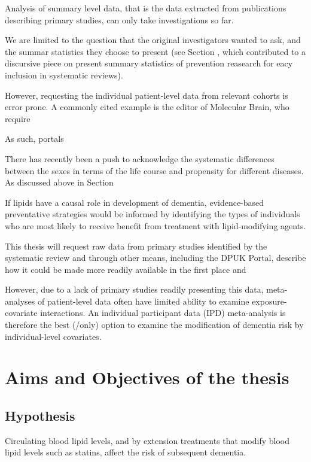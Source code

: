 \documentclass[a4paper,nobind]{templates/ociamthesis}
\begin{document}
Analysis of summary level data, that is the data extracted from publications describing primary studies, can only take investigations so far.

We are limited to the question that the original investigators wanted to ask, and the summar statistics they choose to present (see Section , which contributed to a discursive piece on present summary statistics of prevention reasearch for eacy inclusion in systematic reviews).

However, requesting the individual patient-level data from relevant cohorts is error prone. A commonly cited example is the editor of Molecular Brain, who require

As such, portals

There has recently been a push to acknowledge the systematic differences between the sexes in terms of the life course and propensity for different diseases. As discussed above in Section

If lipids have a causal role in development of dementia, evidence-based preventative strategies would be informed by identifying the types of individuals who are most likely to receive benefit from treatment with lipid-modifying agents.

This thesis will request raw data from primary studies identified by the systematic review and through other means, including the DPUK Portal, describe how it could be made more readily available in the first place and

However, due to a lack of primary studies readily presenting this data, meta-analyses of patient-level data often have limited ability to examine exposure-covariate interactions. An individual participant data (IPD) meta-analysis is therefore the best (/only) option to examine the modification of dementia risk by individual-level covariates.

\hypertarget{aims-and-objectives-of-the-thesis}{%
\section{Aims and Objectives of the thesis}\label{aims-and-objectives-of-the-thesis}}

\hypertarget{hypothesis}{%
\subsection{Hypothesis}\label{hypothesis}}

Circulating blood lipid levels, and by extension treatments that modify blood lipid levels such as statins, affect the risk of subsequent dementia.
\end{document}

